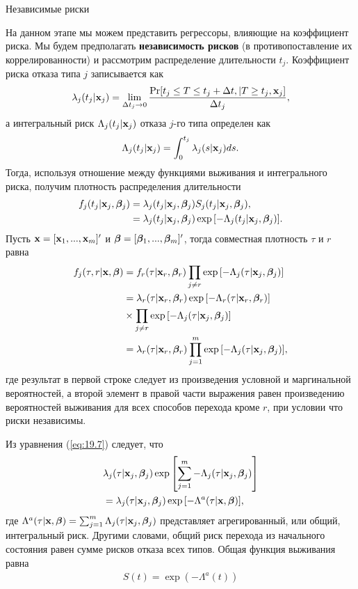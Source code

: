         \begin{center}Независимые риски\end{center}
        \noindent
На данном этапе мы можем представить регрессоры, влияющие на коэффициент риска. Мы будем предполагать \textbf{независимость рисков} (в противопоставление их коррелированности) и рассмотрим распределение длительности $t_j$. Коэффициент риска отказа типа $j$ записывается как
    \begin{align}
    \lambda_j(t_j|\mathbf{x}_j) = \lim_{\Delta t_j \rightarrow 0} \frac{\mathrm{Pr} [t_j \le T \le t_j + \Delta t, | T \ge t_j, \mathbf{x}_j]}{\Delta t_j}, \notag
    \end{align}
а интегральный риск $\Lambda_j(t_j|\mathbf{x}_j)$ отказа $j$-го типа определен как
    \begin{align}
    \Lambda_j(t_j|\mathbf{x}_j) = \int_{0}^{t_j} \lambda_j(s|\mathbf{x}_j)ds. \notag
    \end{align}
Тогда, используя отношение между функциями выживания и интегрального риска, получим плотность распределения длительности
    \begin{align}
    f_j(t_j|\mathbf{x}_j, \bm{\beta}_j)    &= \lambda_j(t_j|\mathbf{x}_j, \bm{\beta}_j) S_j(t_j|\mathbf{x}_j, \bm{\beta}_j), \notag \\
                            &= \lambda_j(t_j|\mathbf{x}_j, \bm{\beta}_j) \exp{[-\Lambda_j(t_j|\mathbf{x}_j, \bm{\beta}_j)]}. \notag
    \end{align}
Пусть $\mathbf{x} = [\mathbf{x}_1, ..., \mathbf{x}_m]'$ и $\bm{\beta} = [\bm{\beta}_1, ..., \bm{\beta}_m]'$, тогда совместная плотность $\tau$ и $r$ равна
    \begin{align}
    \label{eq:19.7}
    f_j(\tau,r|\mathbf{x},\bm{\beta})  &= f_r(\tau|\mathbf{x}_r,\bm{\beta}_r) \prod_{j \ne r} \exp{[- \Lambda_j(\tau |\mathbf{x}_j,\bm{\beta}_j)]} \\
                        &= \lambda_r(\tau|\mathbf{x}_r,\bm{\beta}_r) \exp{[-\Lambda_r(\tau|\mathbf{x}_r,\bm{\beta}_r)]} \notag \\
                        &  \times \prod_{j \ne r} \exp{[-\Lambda_j(\tau|\mathbf{x}_j,\bm{\beta}_j)]} \notag \\
                        &= \lambda_r(\tau|\mathbf{x}_r,\bm{\beta}_r) \prod_{j = 1}^{m} \exp{[-\Lambda_j(\tau|\mathbf{x}_j,\bm{\beta}_j)]}, \notag
    \end{align}
где результат в первой строке следует из произведения условной и маргинальной вероятностей, а второй элемент в правой части выражения равен произведению вероятностей выживания для всех способов перехода кроме $r$, при условии что риски независимы.

Из уравнения (\ref{eq:19.7}) следует, что
    \begin{align}
    \label{eq:19.8}
    & \lambda_j(\tau|\mathbf{x}_j,\bm{\beta}_j) \exp{\left[\sum_{j=1}^{m} - \Lambda_j(\tau|\mathbf{x}_j,\bm{\beta}_j) \right]} \\
    &= \lambda_j(\tau|\mathbf{x}_j,\bm{\beta}_j) \exp{[- \Lambda^a (\tau|\mathbf{x},\bm{\beta})]}, \notag
    \end{align}
где $\Lambda^a (\tau|\mathbf{x},\bm{\beta}) = \sum_{j=1}^{m} \Lambda_j(\tau|\mathbf{x}_j,\bm{\beta}_j)$ представляет агрегированный, или общий, интегральный риск. Другими словами, общий риск перехода из начального состояния равен сумме рисков отказа всех типов. Общая функция выживания равна
    \begin{align}
    \label{eq:19.9}
    S(t) = \exp{(-\Lambda^a (t))}
    \end{align}

